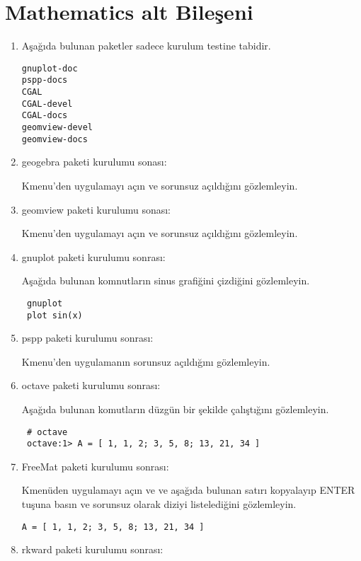\documentclass[a4paper,10pt]{article}
\begin{document}
\section{Mathematics alt Bileşeni}
\begin{enumerate}

\item Aşağıda bulunan paketler sadece kurulum testine tabidir.

\begin{verbatim}
gnuplot-doc
pspp-docs
CGAL
CGAL-devel
CGAL-docs
geomview-devel
geomview-docs
\end{verbatim}

\item geogebra paketi kurulumu sonası:

Kmenu'den uygulamayı açın ve sorunsuz açıldığını gözlemleyin.

\item geomview paketi kurulumu sonası:

Kmenu'den uygulamayı açın ve sorunsuz açıldığını gözlemleyin.

\item gnuplot paketi kurulumu sonrası:

Aşağıda bulunan komnutların sinus grafiğini çizdiğini gözlemleyin.

\begin{verbatim}
 gnuplot
 plot sin(x)
\end{verbatim}

\item pspp paketi kurulumu sonrası:

Kmenu'den uygulamanın sorunsuz açıldığını gözlemleyin.
\item octave paketi kurulumu sonrası:

Aşağıda bulunan komutların düzgün bir şekilde çalıştığını gözlemleyin.
\begin{verbatim}
 # octave 
 octave:1> A = [ 1, 1, 2; 3, 5, 8; 13, 21, 34 ]
\end{verbatim}

\item FreeMat paketi kurulumu sonrası:

Kmenüden uygulamayı açın ve ve aşağıda bulunan satırı kopyalayıp ENTER tuşuna basın ve sorunsuz olarak diziyi listelediğini gözlemleyin.
\begin{verbatim}
A = [ 1, 1, 2; 3, 5, 8; 13, 21, 34 ]
\end{verbatim}



\item rkward paketi kurulumu sonrası:


\end{enumerate}
\end{document}
